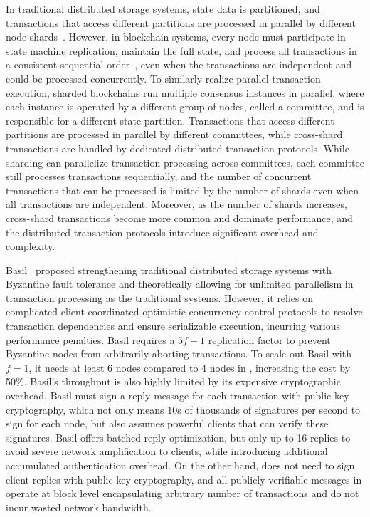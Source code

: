 In traditional distributed storage systems, state data is partitioned, and transactions that access different partitions are processed in parallel by different node shards~\cite{bigtable,gfs,shvachko2010hadoop,weil2006ceph,spanner}.
However, in blockchain systems, every node must participate in state machine replication, maintain the full state, and process all transactions in a consistent sequential order~\cite{rsm}, even when the transactions are independent and could be processed concurrently.
To similarly realize parallel transaction execution, sharded blockchains run multiple consensus instances in parallel, where each instance is operated by a different group of nodes, called a committee, and is responsible for a different state partition.
Transactions that access different partitions are processed in parallel by different committees, while cross-shard transactions are handled by dedicated distributed transaction protocols.
While sharding can parallelize transaction processing across committees, each committee still processes transactions sequentially, and the number of concurrent transactions that can be processed is limited by the number of shards even when all transactions are independent.
Moreover, as the number of shards increases, cross-shard transactions become more common and dominate performance, and the distributed transaction protocols introduce significant overhead and complexity.

Basil~\cite{suri2021basil} proposed strengthening traditional distributed storage systems with Byzantine fault tolerance and theoretically allowing for unlimited parallelism in transaction processing as the traditional systems.
However, it relies on complicated client-coordinated optimistic concurrency control protocols to resolve transaction dependencies and ensure serializable execution, incurring various performance penalties.
Basil requires a $5f+1$ replication factor to prevent Byzantine nodes from arbitrarily aborting transactions.
To scale out Basil with $f=1$, it needs at least 6 nodes compared to 4 nodes in \sys, increasing the cost by 50\%.
Basil's throughput is also highly limited by its expensive cryptographic overhead.
Basil must sign a reply message for each transaction with public key cryptography, which not only means 10s of thousands of signatures per second to sign for each node, but also assumes powerful clients that can verify these signatures.
Basil offers batched reply optimization, but only up to 16 replies to avoid severe network amplification to clients, while introducing additional accumulated authentication overhead.
On the other hand, \sys does not need to sign client replies with public key cryptography, and all publicly verifiable messages in \sys operate at block level encapsulating arbitrary number of transactions and do not incur wasted network bandwidth.

